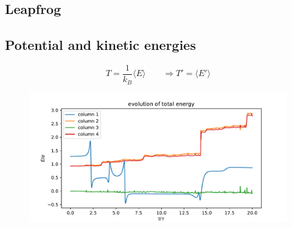 \subsection{Leapfrog}

\subsection{Potential and kinetic energies}
    \begin{equation}
    	T=\frac{1}{k_B}\langle E\rangle \qquad
        \Rightarrow T'=\langle E'\rangle
    \end{equation}

    \begin{figure}[h!]
        \centering
        \includegraphics[width=\textwidth]{../figures/energy.pdf}
        \caption{}
        \label{}
    \end{figure} \ \\ 

